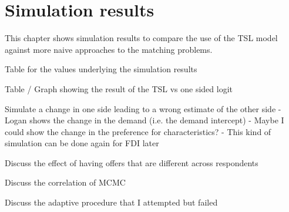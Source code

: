 \chapter{Simulation results}
\label{chap:simulation}

This chapter shows simulation results to compare the use of the TSL model
against more naive approaches to the matching problems.

Table for the values underlying the simulation results

Table / Graph showing the result of the TSL vs one sided logit

Simulate a change in one side leading to a wrong estimate of the other side
- Logan shows the change in the demand (i.e. the demand intercept)
- Maybe I could show the change in the preference for characteristics?
- This kind of simulation can be done again for FDI later

Discuss the effect of having offers that are different across respondents

Discuss the correlation of MCMC

Discuss the adaptive procedure that I attempted but failed